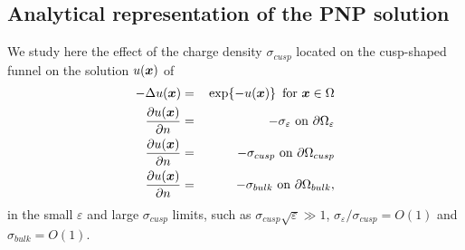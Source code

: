 \documentclass[12pt]{article}
\newcommand{\beq}{\begin{eqnarray}}
\newcommand{\eeq}{\end{eqnarray}}
\newcommand{\p}{\partial}
\newcommand{\eps}{\varepsilon}
\newcommand{\x}{\mbox{\boldmath$x$}}
\begin{document}
{\subsection{Analytical representation of the PNP solution}
We study here the effect of the charge density $\sigma_{cusp}$ located on the cusp-shaped funnel on the solution $u(\x)$ of
\beq\label{NewPb2}
-\Delta {u}(\x)&=&\,\exp\{-{u}(\x)\}\hspace{0.5em}\mbox{for}\ \x\in \Omega\\
 \frac{\p u(\x)}{\p n}&=&-\sigma_{\eps}  \mbox{ on } \p\Omega_{\eps}\nonumber\\
 \frac{\p u(\x)}{\p n}&=& -\sigma_{cusp}  \mbox{ on } \p\Omega_{cusp} \nonumber
 \\
 \frac{\p u(\x)}{\p n}&=&  -\sigma_{bulk} \mbox{ on } \p\Omega_{bulk},\nonumber
\eeq
in the small $\eps$ and large $\sigma_{cusp}$ limits, such as $\sigma_{cusp}\sqrt{\eps}\gg1$, $\sigma_{\eps}/\sigma_{cusp}=O(1)$ and $\sigma_{bulk}=O(1)$.

}
\end{document}
